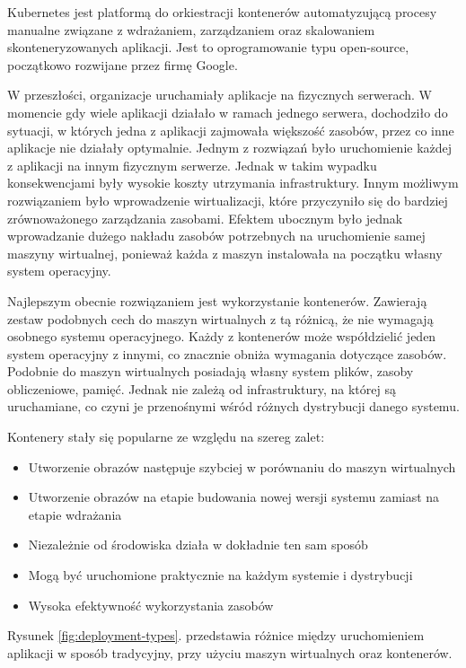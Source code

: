 \documentclass[11pt, a4]{article} %
\begin{document}
Kubernetes jest platformą do orkiestracji kontenerów automatyzującą procesy manualne 
związane z wdrażaniem, zarządzaniem oraz skalowaniem skonteneryzowanych aplikacji. 
Jest to oprogramowanie typu open-source, początkowo rozwijane przez firmę Google.

W przeszłości, organizacje uruchamiały aplikacje na fizycznych serwerach. W momencie 
gdy wiele aplikacji działało w ramach jednego serwera, dochodziło do 
sytuacji, w których jedna z aplikacji zajmowała większość zasobów, przez co inne 
aplikacje nie działały optymalnie. Jednym z rozwiązań było uruchomienie każdej 
z aplikacji na innym fizycznym serwerze. Jednak w takim wypadku konsekwencjami były 
wysokie koszty utrzymania infrastruktury. Innym możliwym rozwiązaniem było wprowadzenie 
wirtualizacji, które przyczyniło się do bardziej zrównoważonego zarządzania zasobami. 
Efektem ubocznym było jednak wprowadzanie dużego nakładu zasobów potrzebnych na 
uruchomienie samej maszyny wirtualnej, ponieważ każda z maszyn instalowała na początku 
własny system operacyjny.

Najlepszym obecnie rozwiązaniem jest wykorzystanie kontenerów. Zawierają zestaw 
podobnych cech do maszyn wirtualnych z tą różnicą, że nie wymagają osobnego systemu 
operacyjnego. Każdy z kontenerów może współdzielić jeden system operacyjny z 
innymi, co znacznie obniża wymagania dotyczące zasobów. Podobnie do maszyn 
wirtualnych posiadają własny system plików, zasoby obliczeniowe, pamięć. Jednak nie 
zależą od infrastruktury, na której są uruchamiane, co czyni je przenośnymi wśród 
różnych dystrybucji danego systemu.

Kontenery stały się popularne ze względu na szereg zalet:

\begin{itemize} %
    \item Utworzenie obrazów następuje szybciej w porównaniu do maszyn wirtualnych
    \item Utworzenie obrazów na etapie budowania nowej wersji systemu zamiast na etapie wdrażania
    \item Niezależnie od środowiska działa w dokładnie ten sam sposób
    \item Mogą być uruchomione praktycznie na każdym systemie i dystrybucji
    \item Wysoka efektywność wykorzystania zasobów
\end{itemize}

Rysunek \ref{fig:deployment-types}. przedstawia różnice między uruchomieniem aplikacji w sposób 
tradycyjny, przy użyciu maszyn wirtualnych oraz kontenerów.
\end{document}
